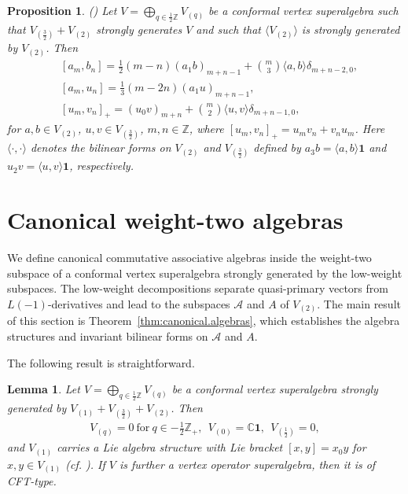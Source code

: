 \documentclass[12pt]{article}
\numberwithin{equation}{section}
\newtheorem{lemma}[theorem]{Lemma}
\newtheorem{proposition}[theorem]{Proposition}
\theoremstyle{definition}
\theoremstyle{plain}
\newcommand{\bC}{\ensuremath{\mathbb{C}}}
\newcommand{\bZ}{\ensuremath{\mathbb{Z}}}
\newcommand{\cA}{\ensuremath{\mathcal{A}}}
\newcommand{\bone}{\mathbf{1 }}
\begin{document}
\begin{proposition}\label{prop:LY}\textup{(\cite{LY})}
    Let $V=\bigoplus_{q\in\frac{1}{2}\bZ}V_{(q)}$ be a conformal vertex superalgebra such that $V_{(\frac{3}{2})}+V_{(2)}$ strongly generates $V$ and such that $\langle V_{(2)}\rangle$ is strongly generated by $V_{(2)}$. Then
    \begin{align*}
        &[a_m,b_n]=\frac{1}{2}(m-n)(a_1b)_{m+n-1}+\binom{m}{3}\langle a,b\rangle\delta_{m+n-2,0},\\
        &[a_m,u_n]=\frac{1}{3}(m-2n)(a_1u)_{m+n-1},\\
        &[u_m,v_n]_+=(u_0v)_{m+n}+\binom{m}{2}\langle u,v\rangle\delta_{m+n-1,0},
    \end{align*}
    for $a,b\in V_{(2)}$, $u,v\in V_{(\frac{3}{2})}$, $m,n\in\bZ$, where $[u_m,v_n]_+=u_mv_n+v_nu_m$. Here $\langle\cdot,\cdot\rangle$ denotes the bilinear forms on $V_{(2)}$ and $V_{(\frac{3}{2})}$ defined by $a_3b=\langle a,b\rangle\bone$ and $u_2v=\langle u,v\rangle\bone$, respectively.
\end{proposition}

\section{Canonical weight-two algebras}\label{sect:Construction}
\hspace{1.5em}We define canonical commutative associative algebras inside the weight-two subspace of a conformal vertex superalgebra strongly generated by the low-weight subspaces. The low-weight decompositions separate quasi-primary vectors from $L(-1)$-derivatives and lead to the subspaces $\cA$ and $A$ of $V_{(2)}$. The main result of this section is Theorem~\ref{thm:canonical.algebras}, which establishes the algebra structures and invariant bilinear forms on $\cA$ and $A$. 

The following result is straightforward.
\begin{lemma}\label{lem:CFT}
    Let $V=\bigoplus_{q\in\frac{1}{2}\bZ}V_{(q)}$ be a conformal vertex superalgebra strongly generated by $V_{(1)}+V_{(\frac{3}{2})}+V_{(2)}$. Then
    \begin{align*}
        V_{(q)}=0\ \text{for}\ q\in-\frac{1}{2}\bZ_+,\ \ V_{(0)}=\bC\bone,\ \ V_{(\frac{1}{2})}=0,
    \end{align*}
    and $V_{(1)}$ carries a Lie algebra structure with Lie bracket $[x,y]=x_0y$ for $x,y\in V_{(1)}$ \textup{(cf. \cite[Theorem~3.7]{Lian})}. If $V$ is further a vertex operator superalgebra, then it is of CFT-type.
\end{lemma}
\end{document}
